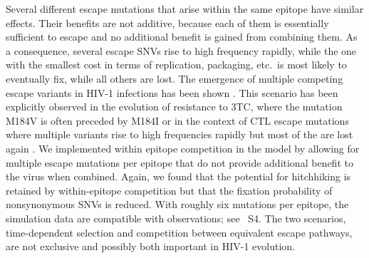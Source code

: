 \documentclass[11pt]{article}
\newcommand{\withinepi}{4}
\begin{document}
Several different escape mutations that arise within the same epitope
have similar effects. Their benefits are not additive, because each of
them is essentially sufficient to escape and no additional benefit is
gained from combining them. As a consequence, several escape SNVs rise
to high frequency rapidly, while the one with the smallest cost in terms
of replication, packaging, etc.~is most likely to eventually fix, while
all others are lost. The emergence of multiple competing escape variants
in HIV-1 infections has been shown \citep{moore_limited_2009,
  bar_early_2012,wei_antibody_2003}.  This scenario has been explicitly
observed in the evolution of resistance to 3TC, where the mutation M184V
is often preceded by M184I \citep{hedskog_dynamics_2010} or in the
context of CTL escape mutations where multiple variants rise to high
frequencies rapidly but most of the are lost again
\citep{fischer_transmission_2010}. We implemented within epitope
competition in the model by allowing for multiple escape mutations per
epitope that do not provide additional benefit to the virus when
combined. Again, we found that the potential for hitchhiking is retained
by within-epitope competition but that the fixation probability of
nonsynonymous SNVs is reduced. With roughly six mutations per epitope,
the simulation data are compatible with observations; see
\figurename~S\withinepi. The two scenarios, time-dependent selection and
competition between equivalent escape pathways, are not exclusive and
possibly both important in HIV-1 evolution.

\end{document}
